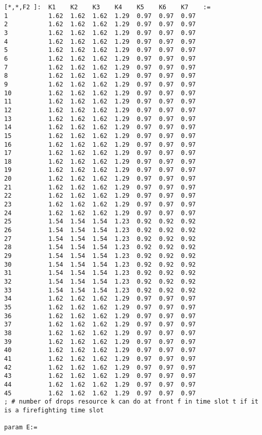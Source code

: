 \begin{lstlisting}
[*,*,F2 ]:  K1    K2    K3    K4    K5    K6    K7    :=
1           1.62  1.62  1.62  1.29  0.97  0.97  0.97
2           1.62  1.62  1.62  1.29  0.97  0.97  0.97
3           1.62  1.62  1.62  1.29  0.97  0.97  0.97
4           1.62  1.62  1.62  1.29  0.97  0.97  0.97
5           1.62  1.62  1.62  1.29  0.97  0.97  0.97
6           1.62  1.62  1.62  1.29  0.97  0.97  0.97
7           1.62  1.62  1.62  1.29  0.97  0.97  0.97
8           1.62  1.62  1.62  1.29  0.97  0.97  0.97
9           1.62  1.62  1.62  1.29  0.97  0.97  0.97
10          1.62  1.62  1.62  1.29  0.97  0.97  0.97
11          1.62  1.62  1.62  1.29  0.97  0.97  0.97
12          1.62  1.62  1.62  1.29  0.97  0.97  0.97
13          1.62  1.62  1.62  1.29  0.97  0.97  0.97
14          1.62  1.62  1.62  1.29  0.97  0.97  0.97
15          1.62  1.62  1.62  1.29  0.97  0.97  0.97
16          1.62  1.62  1.62  1.29  0.97  0.97  0.97
17          1.62  1.62  1.62  1.29  0.97  0.97  0.97
18          1.62  1.62  1.62  1.29  0.97  0.97  0.97
19          1.62  1.62  1.62  1.29  0.97  0.97  0.97
20          1.62  1.62  1.62  1.29  0.97  0.97  0.97
21          1.62  1.62  1.62  1.29  0.97  0.97  0.97
22          1.62  1.62  1.62  1.29  0.97  0.97  0.97
23          1.62  1.62  1.62  1.29  0.97  0.97  0.97
24          1.62  1.62  1.62  1.29  0.97  0.97  0.97
25          1.54  1.54  1.54  1.23  0.92  0.92  0.92
26          1.54  1.54  1.54  1.23  0.92  0.92  0.92
27          1.54  1.54  1.54  1.23  0.92  0.92  0.92
28          1.54  1.54  1.54  1.23  0.92  0.92  0.92
29          1.54  1.54  1.54  1.23  0.92  0.92  0.92
30          1.54  1.54  1.54  1.23  0.92  0.92  0.92
31          1.54  1.54  1.54  1.23  0.92  0.92  0.92
32          1.54  1.54  1.54  1.23  0.92  0.92  0.92
33          1.54  1.54  1.54  1.23  0.92  0.92  0.92
34          1.62  1.62  1.62  1.29  0.97  0.97  0.97
35          1.62  1.62  1.62  1.29  0.97  0.97  0.97
36          1.62  1.62  1.62  1.29  0.97  0.97  0.97
37          1.62  1.62  1.62  1.29  0.97  0.97  0.97
38          1.62  1.62  1.62  1.29  0.97  0.97  0.97
39          1.62  1.62  1.62  1.29  0.97  0.97  0.97
40          1.62  1.62  1.62  1.29  0.97  0.97  0.97
41          1.62  1.62  1.62  1.29  0.97  0.97  0.97
42          1.62  1.62  1.62  1.29  0.97  0.97  0.97
43          1.62  1.62  1.62  1.29  0.97  0.97  0.97
44          1.62  1.62  1.62  1.29  0.97  0.97  0.97
45          1.62  1.62  1.62  1.29  0.97  0.97  0.97
; # number of drops resource k can do at front f in time slot t if it is a firefighting time slot

param E:=


\end{lstlisting}
